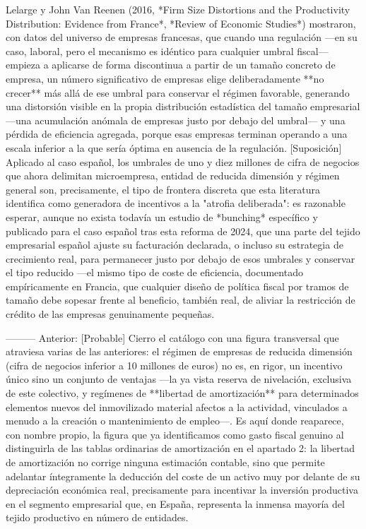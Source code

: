 \documentclass[10pt,a4paper]{article}
\begin{document}
Lelarge y John Van Reenen (2016, *Firm Size Distortions and the Productivity Distribution: Evidence from France*, *Review of Economic Studies*) mostraron, con datos del universo de empresas francesas, que cuando una regulación —en su caso, laboral, pero el mecanismo es idéntico para cualquier umbral fiscal— empieza a aplicarse de forma discontinua a partir de un tamaño concreto de empresa, un número significativo de empresas elige deliberadamente **no crecer** más allá de ese umbral para conservar el régimen favorable, generando una distorsión visible en la propia distribución estadística del tamaño empresarial —una acumulación anómala de empresas justo por debajo del umbral— y una pérdida de eficiencia agregada, porque esas empresas terminan operando a una escala inferior a la que sería óptima en ausencia de la regulación. [Suposición] Aplicado al caso español, los umbrales de uno y diez millones de cifra de negocios que ahora delimitan microempresa, entidad de reducida dimensión y régimen general son, precisamente, el tipo de frontera discreta que esta literatura identifica como generadora de incentivos a la "atrofia deliberada": es razonable esperar, aunque no exista todavía un estudio de *bunching* específico y publicado para el caso español tras esta reforma de 2024, que una parte del tejido empresarial español ajuste su facturación declarada, o incluso su estrategia de crecimiento real, para permanecer justo por debajo de esos umbrales y conservar el tipo reducido —el mismo tipo de coste de eficiencia, documentado empíricamente en Francia, que cualquier diseño de política fiscal por tramos de tamaño debe sopesar frente al beneficio, también real, de aliviar la restricción de crédito de las empresas genuinamente pequeñas.

--------- Anterior:
[Probable] Cierro el catálogo con una figura transversal que atraviesa varias de las anteriores: el régimen de empresas de reducida dimensión (cifra de negocios inferior a 10 millones de euros) no es, en rigor, un incentivo único sino un conjunto de ventajas —la ya vista reserva de nivelación, exclusiva de este colectivo, y regímenes de **libertad de amortización** para determinados elementos nuevos del inmovilizado material afectos a la actividad, vinculados a menudo a la creación o mantenimiento de empleo—. Es aquí donde reaparece, con nombre propio, la figura que ya identificamos como gasto fiscal genuino al distinguirla de las tablas ordinarias de amortización en el apartado 2: la libertad de amortización no corrige ninguna estimación contable, sino que permite adelantar íntegramente la deducción del coste de un activo muy por delante de su depreciación económica real, precisamente para incentivar la inversión productiva en el segmento empresarial que, en España, representa la inmensa mayoría del tejido productivo en número de entidades.
\end{document}
